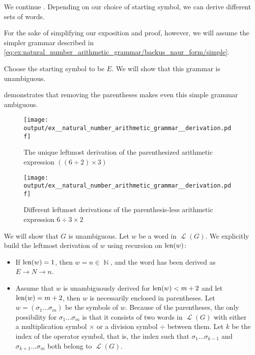 \begin{example}\label{ex:natural_number_arithmetic_grammar/derivation}
  We continue . Depending on our choice of starting symbol, we can derive different sets of words.

  For the sake of simplifying our exposition and proof, however, we will assume the simpler grammar described in \eqref{eq:ex:natural_number_arithmetic_grammar/backus_naur_form/simple}.

  Choose the starting symbol to be \( E \). We will show that this grammar is unambiguous.

   demonstrates that removing the parentheses makes even this simple grammar ambiguous.

  \begin{figure}[!ht]
    \hfill
    \texttt{[image: output/ex\_\_natural\_number\_arithmetic\_grammar\_\_derivation.pdf]}
    \hfill\hfill
    \caption{The unique leftmost derivation of the parenthesized arithmetic expression \( ((6 \div 2) \times 3) \)}
    \label{fig:ex:natural_number_arithmetic_grammar/derivation/unambiguous}
  \end{figure}

  \begin{figure}[!ht]
    \hfill
    \texttt{[image: output/ex\_\_natural\_number\_arithmetic\_grammar\_\_derivation.pdf]}
    \hfill\hfill
    \caption{Different leftmost derivations of the parenthesis-less arithmetic expression \( 6 \div 3 \times 2 \)}
    \label{fig:ex:natural_number_arithmetic_grammar/derivation/ambiguous}
  \end{figure}

  We will show that \( G \) is unambiguous. Let \( w \) be a word in \( \mscrL(G) \). We explicitly build the leftmost derivation of \( w \) using recursion on \( \operatorname{len}(w) \):
  \begin{itemize}
    \item If \( \operatorname{len}(w) = 1 \), then \( w = n \in \BbbN \), and the word has been derived as \( E \to N \to n \).

    \item Assume that \( w \) is unambiguously derived for \( \operatorname{len}(w) < m + 2 \) and let \( \operatorname{len}(w) = m + 2 \), then \( w \) is necessarily enclosed in parentheses. Let \( w = ( \sigma_1 \ldots \sigma_m ) \) be the symbols of \( w \). Because of the parentheses, the only possibility for \( \sigma_1 \ldots \sigma_m \) is that it consists of two words in \( \mscrL(G) \) with either a multiplication symbol \( \times \) or a division symbol \( \div \) between them. Let \( k \) be the index of the operator symbol, that is, the index such that \( \sigma_1 \ldots \sigma_{k-1} \) and \( \sigma_{k+1} \ldots \sigma_m \) both belong to \( \mscrL(G) \).


\end{itemize}
\end{example}
